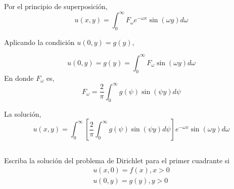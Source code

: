 \begin{solution}
\linea 

Por el principio de superposición, 
$$u(x,y)=\int_0^\infty F_\omega e^{-\omega x}\sin(\omega y) d \omega $$

Aplicando la condición $u(0,y)=g(y)$, 

$$u(0,y)=g(y)=\int_0^\infty F_\omega\sin(\omega y) d \omega $$
En donde $F_\omega$ es, 
$$F_\omega= \frac{2}{\pi}\int_0^\infty g(\psi)\sin(\psi y)d\psi $$

\linea 

La solución, 
$$u(x,y)=\int_0^\infty \left[\frac{2}{\pi}\int_0^\infty g(\psi)\sin(\psi y)d\psi\right] e^{-\omega x}\sin(\omega y) d \omega $$

\end{solution}










\subsection{} Escriba la solución del problema de Dirichlet para el primer cuadrante si
$$
\begin{array}{l}
u(x, 0)=f(x), x>0 \\
u(0, y)=g(y), y>0
\end{array}
$$

